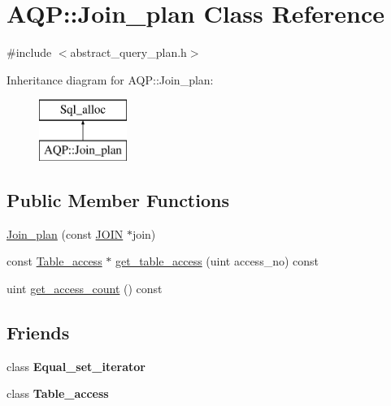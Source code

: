 \hypertarget{classAQP_1_1Join__plan}{}\section{A\+QP\+:\+:Join\+\_\+plan Class Reference}
\label{classAQP_1_1Join__plan}


{\ttfamily \#include $<$abstract\+\_\+query\+\_\+plan.\+h$>$}

Inheritance diagram for A\+QP\+:\+:Join\+\_\+plan\+:\begin{figure}[H]
\begin{center}
\leavevmode
\includegraphics[height=2.000000cm]{classAQP_1_1Join__plan}
\end{center}
\end{figure}
\subsection*{Public Member Functions}
\begin{DoxyCompactItemize}
\item 
\mbox{\hyperlink{classAQP_1_1Join__plan_a93bbcdd095b3cc551f4cd5d767c21462}{Join\+\_\+plan}} (const \mbox{\hyperlink{classJOIN}{J\+O\+IN}} $\ast$join)
\item 
const \mbox{\hyperlink{classAQP_1_1Table__access}{Table\+\_\+access}} $\ast$ \mbox{\hyperlink{classAQP_1_1Join__plan_aa9112ca023025f15a0b908f8cc519d18}{get\+\_\+table\+\_\+access}} (uint access\+\_\+no) const
\item 
uint \mbox{\hyperlink{classAQP_1_1Join__plan_a92950b7a49e0702cf5490b0f0797a076}{get\+\_\+access\+\_\+count}} () const
\end{DoxyCompactItemize}
\subsection*{Friends}
\begin{DoxyCompactItemize}
\item 
\mbox{\label{classAQP_1_1Join__plan_a14c1db5217af73d3cd80b811e44f7673}} 
class {\bfseries Equal\+\_\+set\+\_\+iterator}
\item 
\mbox{\label{classAQP_1_1Join__plan_aa52c20313adab56e5186c04edc232fa9}} 
class {\bfseries Table\+\_\+access}
\end{DoxyCompactItemize}
